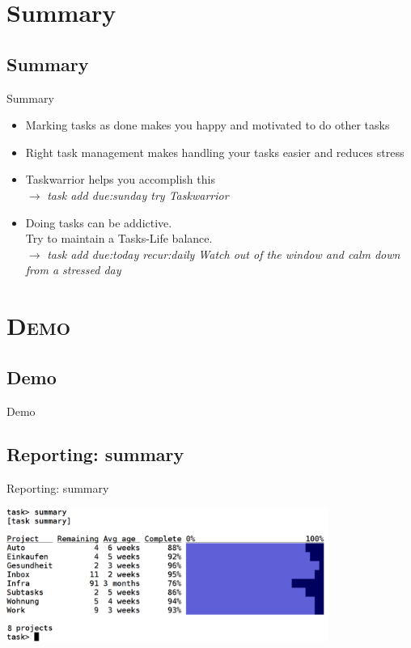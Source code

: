 \documentclass[xcolor=x11names,compress]{beamer}
\renewcommand{\(}{\begin{columns}}
\renewcommand{\)}{\end{columns}}
\newcommand{\<}[1]{\begin{column}{#1}}
\renewcommand{\>}{\end{column}}
\begin{document}
\section{Summary}
\subsection*{Summary}
\begin{frame}[fragile]{Summary}
\pause
	\begin{itemize}[<+-| alert@+>]
		\setlength\itemsep{2em}
		\item Marking tasks as done makes you happy and motivated to do other tasks
		\item Right task management makes handling your tasks easier and reduces stress
		\item Taskwarrior helps you accomplish this \\ $\rightarrow$ \textit{task add due:sunday try Taskwarrior}
		\item Doing tasks can be addictive. \\ Try to maintain a Tasks-Life balance. \\ $\rightarrow$ \textit{task add due:today recur:daily Watch out of the window and calm down from a stressed day}
	\end{itemize}
\end{frame}

\section{\scshape{Demo}}


\subsection*{Demo}
\begin{frame}[fragile]{}
	\begin{center}
		\huge{Demo}
	\end{center}
\end{frame}

\subsection*{Reporting: summary}
\begin{frame}[fragile]{Reporting: summary}
	\begin{center}
		\includegraphics[width=10.5cm]{screenshots/summary.png}
	\end{center}
\end{frame}
\end{document}
